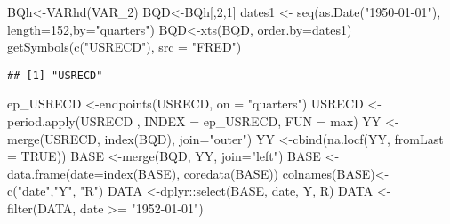 \documentclass[
]{book}
\newenvironment{Shaded}{\begin{snugshade}}{\end{snugshade}}
\newcommand{\AttributeTok}[1]{\textcolor[rgb]{0.77,0.63,0.00}{#1}}
\newcommand{\ConstantTok}[1]{\textcolor[rgb]{0.00,0.00,0.00}{#1}}
\newcommand{\DecValTok}[1]{\textcolor[rgb]{0.00,0.00,0.81}{#1}}
\newcommand{\FunctionTok}[1]{\textcolor[rgb]{0.00,0.00,0.00}{#1}}
\newcommand{\NormalTok}[1]{#1}
\newcommand{\OtherTok}[1]{\textcolor[rgb]{0.56,0.35,0.01}{#1}}
\newcommand{\SpecialCharTok}[1]{\textcolor[rgb]{0.00,0.00,0.00}{#1}}
\newcommand{\StringTok}[1]{\textcolor[rgb]{0.31,0.60,0.02}{#1}}
\begin{document}
\begin{Shaded}
\begin{Highlighting}[]
\NormalTok{BQh}\OtherTok{\textless{}{-}}\FunctionTok{VARhd}\NormalTok{(VAR\_2)}
\NormalTok{BQD}\OtherTok{\textless{}{-}}\NormalTok{BQh[,}\DecValTok{2}\NormalTok{,}\DecValTok{1}\NormalTok{]}
\NormalTok{dates1     }\OtherTok{\textless{}{-}} \FunctionTok{seq}\NormalTok{(}\FunctionTok{as.Date}\NormalTok{(}\StringTok{"1950{-}01{-}01"}\NormalTok{), }\AttributeTok{length=}\DecValTok{152}\NormalTok{,}\AttributeTok{by=}\StringTok{"quarters"}\NormalTok{)}
\NormalTok{BQD}\OtherTok{\textless{}{-}}\FunctionTok{xts}\NormalTok{(BQD, }\AttributeTok{order.by=}\NormalTok{dates1)}
\FunctionTok{getSymbols}\NormalTok{(}\FunctionTok{c}\NormalTok{(}\StringTok{"USRECD"}\NormalTok{),}
           \AttributeTok{src =} \StringTok{"FRED"}\NormalTok{)}
\end{Highlighting}
\end{Shaded}

\begin{verbatim}
## [1] "USRECD"
\end{verbatim}

\begin{Shaded}
\begin{Highlighting}[]
\NormalTok{ep\_USRECD  }\OtherTok{\textless{}{-}}\FunctionTok{endpoints}\NormalTok{(USRECD, }\AttributeTok{on =} \StringTok{"quarters"}\NormalTok{)}
\NormalTok{USRECD     }\OtherTok{\textless{}{-}}\FunctionTok{period.apply}\NormalTok{(USRECD , }\AttributeTok{INDEX =}\NormalTok{ ep\_USRECD, }\AttributeTok{FUN =}\NormalTok{ max)}
\NormalTok{YY         }\OtherTok{\textless{}{-}}\FunctionTok{merge}\NormalTok{(USRECD, }\FunctionTok{index}\NormalTok{(BQD), }\AttributeTok{join=}\StringTok{"outer"}\NormalTok{)}
\NormalTok{YY         }\OtherTok{\textless{}{-}}\FunctionTok{cbind}\NormalTok{(}\FunctionTok{na.locf}\NormalTok{(YY, }\AttributeTok{fromLast =} \ConstantTok{TRUE}\NormalTok{))}
\NormalTok{BASE       }\OtherTok{\textless{}{-}}\FunctionTok{merge}\NormalTok{(BQD, YY, }\AttributeTok{join=}\StringTok{"left"}\NormalTok{)}
\NormalTok{BASE       }\OtherTok{\textless{}{-}}\FunctionTok{data.frame}\NormalTok{(}\AttributeTok{date=}\FunctionTok{index}\NormalTok{(BASE), }\FunctionTok{coredata}\NormalTok{(BASE))}
\FunctionTok{colnames}\NormalTok{(BASE)}\OtherTok{\textless{}{-}}\FunctionTok{c}\NormalTok{(}\StringTok{"date"}\NormalTok{,}\StringTok{"Y"}\NormalTok{, }\StringTok{"R"}\NormalTok{)}
\NormalTok{DATA    }\OtherTok{\textless{}{-}}\NormalTok{dplyr}\SpecialCharTok{::}\FunctionTok{select}\NormalTok{(BASE, date, Y, R)}
\NormalTok{DATA    }\OtherTok{\textless{}{-}}\FunctionTok{filter}\NormalTok{(DATA, date }\SpecialCharTok{\textgreater{}=} \StringTok{"1952{-}01{-}01"}\NormalTok{)}
\end{Highlighting}
\end{Shaded}
\end{document}
